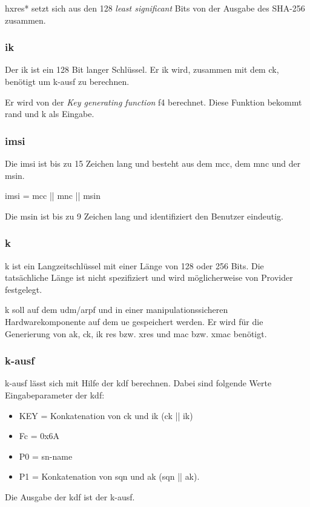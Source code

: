 \gls{hxres*} setzt sich aus den 128 \textit{least significant} Bits von der Ausgabe des SHA-256 zusammen.

\subsubsection{\gls{ik}}
Der \gls{ik} ist ein 128 Bit langer Schlüssel. %
Er \gls{ik} wird, zusammen mit dem \gls{ck}, benötigt um \gls{k-ausf} zu berechnen.

Er wird von der \textit{Key generating function} f4 berechnet.
Diese Funktion bekommt \gls{rand} und \gls{k} als Eingabe. %


\subsubsection{\gls{imsi}}
Die \gls{imsi} ist bis zu 15 Zeichen lang und besteht aus dem \gls{mcc}, dem \gls{mnc} und der \gls{msin}. %

\gls{imsi} = \gls{mcc} || \gls{mnc} || \gls{msin}

Die \gls{msin} ist bis zu 9 Zeichen lang und identifiziert den Benutzer eindeutig. %

\subsubsection{\gls{k}}
\gls{k} ist ein Langzeitschlüssel mit einer Länge von 128 oder 256 Bits. %
Die tatsächliche Länge ist nicht spezifiziert und wird möglicherweise von Provider festgelegt. %

\gls{k} soll auf dem \gls{udm}/\gls{arpf} und in einer manipulationssicheren Hardwarekomponente auf dem \gls{ue} gespeichert werden.  %
Er wird für die Generierung von \gls{ak}, \gls{ck}, \gls{ik} \gls{res} bzw. \gls{xres} und \gls{mac} bzw. \gls{xmac} benötigt. 

\subsubsection{\gls{k-ausf}}
\gls{k-ausf} lässt sich mit Hilfe der \gls{kdf} berechnen.
Dabei sind folgende Werte Eingabeparameter der \gls{kdf}: %
\begin{itemize}
\item KEY = Konkatenation von \gls{ck} und \gls{ik} (\gls{ck} || \gls{ik})
\item Fc = 0x6A
\item P0 = \gls{sn-name}
\item P1 = Konkatenation von \gls{sqn} und \gls{ak} (\gls{sqn} || \gls{ak}).
\end{itemize}
Die Ausgabe der \gls{kdf} ist der \gls{k-ausf}.

